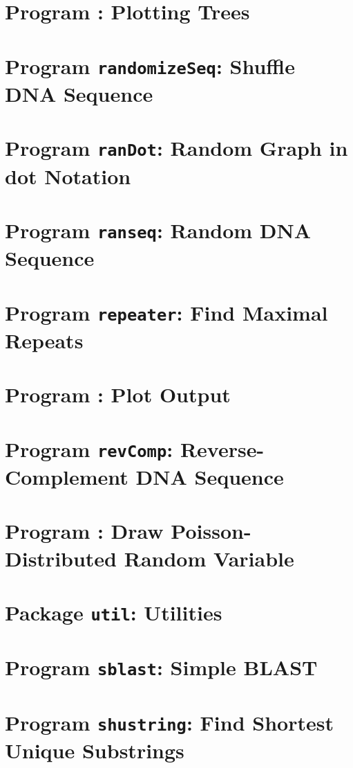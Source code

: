 \documentclass[a4paper]{report}
\begin{document}
\chapter{Program : Plotting Trees}\label{ch:pt}

\chapter{Program \texttt{randomizeSeq}: Shuffle DNA
  Sequence}\label{ch:rs}

\chapter{Program \texttt{ranDot}: Random Graph in dot Notation}\label{ch:rd}

\chapter{Program \texttt{ranseq}: Random DNA Sequence}\label{ch:ran}

\chapter{Program \texttt{repeater}: Find Maximal
  Repeats}\label{ch:rep}

\chapter{Program : Plot 
  Output}\label{ch:r2p}

\chapter{Program \texttt{revComp}: Reverse-Complement DNA
  Sequence}\label{ch:rev}

\chapter{Program : Draw Poisson-Distributed Random
  Variable}\label{ch:rpo}

\chapter{Package \texttt{util}: Utilities}\label{ch:uti}

\chapter{Program \texttt{sblast}: Simple BLAST}\label{ch:sb}

\chapter{Program \texttt{shustring}: Find Shortest Unique Substrings}\label{ch:shu}

\end{document}
